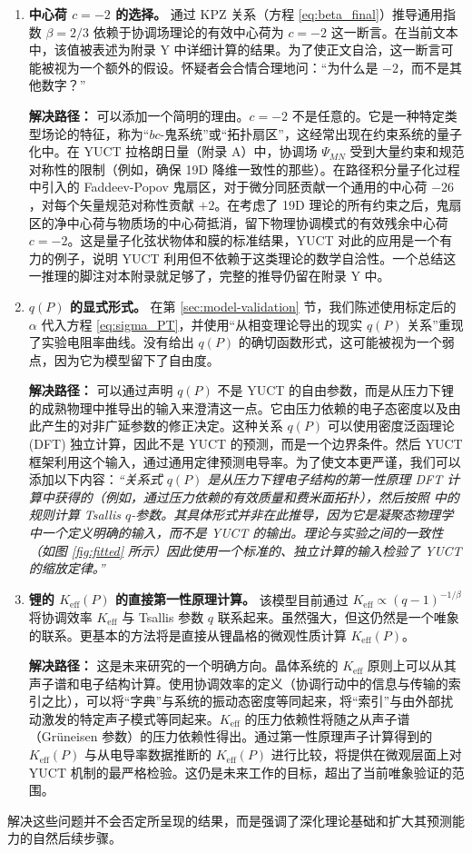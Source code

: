\documentclass[12pt,a4paper]{article}
\theoremstyle{remark}
\newcommand{\Ke}{K_{\mathrm{eff}}}
\begin{document}
	\begin{enumerate}
		\item \textbf{中心荷 \(c = -2\) 的选择。} 通过 KPZ 关系（方程 \ref{eq:beta_final}）推导通用指数 \(\beta = 2/3\) 依赖于协调场理论的有效中心荷为 \(c = -2\) 这一断言。在当前文本中，该值被表述为附录 Y 中详细计算的结果。为了使正文自洽，这一断言可能被视为一个额外的假设。怀疑者会合情合理地问：“为什么是 \(-2\)，而不是其他数字？”
		
		\textbf{解决路径：} 可以添加一个简明的理由。\(c = -2\) 不是任意的。它是一种特定类型场论的特征，称为“\(bc\)-鬼系统”或“拓扑扇区”，这经常出现在约束系统的量子化中。在 YUCT 拉格朗日量（附录 A）中，协调场 \(\Psi_{MN}\) 受到大量约束和规范对称性的限制（例如，确保 19D 降维一致性的那些）。在路径积分量子化过程中引入的 Faddeev-Popov 鬼扇区，对于微分同胚贡献一个通用的中心荷 \(-26\)，对每个矢量规范对称性贡献 \(+2\)。在考虑了 19D 理论的所有约束之后，鬼扇区的净中心荷与物质场的中心荷抵消，留下物理协调模式的有效残余中心荷 \(c = -2\)。这是量子化弦状物体和膜的标准结果，YUCT 对此的应用是一个有力的例子，说明 YUCT 利用但不依赖于这类理论的数学自洽性。一个总结这一推理的脚注对本附录就足够了，完整的推导仍留在附录 Y 中。
		
		\item \textbf{\(q(P)\) 的显式形式。} 在第 \ref{sec:model-validation} 节，我们陈述使用标定后的 \(\alpha\) 代入方程 \eqref{eq:sigma_PT}，并使用“从相变理论导出的现实 \(q(P)\) 关系”重现了实验电阻率曲线。没有给出 \(q(P)\) 的确切函数形式，这可能被视为一个弱点，因为它为模型留下了自由度。
		
		\textbf{解决路径：} 可以通过声明 \(q(P)\) 不是 YUCT 的自由参数，而是从压力下锂的成熟物理中推导出的输入来澄清这一点。它由压力依赖的电子态密度以及由此产生的对非广延参数的修正决定。这种关系 \(q(P)\) 可以使用密度泛函理论 (DFT) 独立计算，因此不是 YUCT 的预测，而是一个边界条件。然后 YUCT 框架利用这个输入，通过通用定律预测电导率。为了使文本更严谨，我们可以添加以下内容：\textit{“关系式 \(q(P)\) 是从压力下锂电子结构的第一性原理 DFT 计算中获得的（例如，通过压力依赖的有效质量和费米面拓扑），然后按照 \cite{Tsallis2009} 中的规则计算 Tsallis \(q\)-参数。其具体形式并非在此推导，因为它是凝聚态物理学中一个定义明确的输入，而不是 YUCT 的输出。理论与实验之间的一致性（如图 \ref{fig:fitted} 所示）因此使用一个标准的、独立计算的输入检验了 YUCT 的缩放定律。”}
		
		\item \textbf{锂的 \(\Ke(P)\) 的直接第一性原理计算。} 该模型目前通过 \(\Ke \propto (q-1)^{-1/\beta}\) 将协调效率 \(\Ke\) 与 Tsallis 参数 \(q\) 联系起来。虽然强大，但这仍然是一个唯象的联系。更基本的方法将是直接从锂晶格的微观性质计算 \(\Ke(P)\)。
		
		\textbf{解决路径：} 这是未来研究的一个明确方向。晶体系统的 \(\Ke\) 原则上可以从其声子谱和电子结构计算。使用协调效率的定义（协调行动中的信息与传输的索引之比），可以将“字典”与系统的振动态密度等同起来，将“索引”与由外部扰动激发的特定声子模式等同起来。\(\Ke\) 的压力依赖性将随之从声子谱（Grüneisen 参数）的压力依赖性得出。通过第一性原理声子计算得到的 \(\Ke(P)\) 与从电导率数据推断的 \(\Ke(P)\) 进行比较，将提供在微观层面上对 YUCT 机制的最严格检验。这仍是未来工作的目标，超出了当前唯象验证的范围。
	\end{enumerate}
	解决这些问题并不会否定所呈现的结果，而是强调了深化理论基础和扩大其预测能力的自然后续步骤。
	
\end{document}
